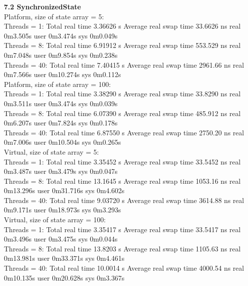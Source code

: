 \documentclass[letterpaper,twocolumn,10pt]{article}
\begin{document}
\textbf{7.2 SynchronizedState}\\

\noindent Platform, size of state array = 5:\\
Threads = 1: Total real time 3.36626 s
Average real swap time 33.6626 ns
real    0m3.505s
user    0m3.474s
sys     0m0.049s\\
Threads = 8: Total real time 6.91912 s
Average real swap time 553.529 ns
real    0m7.048s
user    0m9.854s
sys     0m0.238s\\
Threads = 40: Total real time 7.40415 s
Average real swap time 2961.66 ns
real    0m7.566s
user    0m10.274s
sys     0m0.112s\\

\noindent Platform, size of state array = 100:\\
Threads = 1: Total real time 3.38290 s
Average real swap time 33.8290 ns
real    0m3.511s
user    0m3.474s
sys     0m0.039s\\
Threads = 8: Total real time 6.07390 s
Average real swap time 485.912 ns
real    0m6.207s
user    0m7.824s
sys     0m0.178s\\
Threads = 40: Total real time 6.87550 s
Average real swap time 2750.20 ns
real    0m7.006s
user    0m10.504s
sys     0m0.265s\\

\noindent Virtual, size of state array = 5:\\
Threads = 1: Total real time 3.35452 s
Average real swap time 33.5452 ns
real    0m3.487s
user    0m3.479s
sys     0m0.047s\\
Threads = 8: Total real time 13.1645 s
Average real swap time 1053.16 ns
real    0m13.296s
user    0m31.716s
sys     0m4.602s\\
Threads = 40: Total real time 9.03720 s
Average real swap time 3614.88 ns
real    0m9.171s
user    0m18.973s
sys     0m3.293s\\

\noindent Virtual, size of state array = 100:\\
Threads = 1: Total real time 3.35417 s
Average real swap time 33.5417 ns
real    0m3.496s
user    0m3.475s
sys     0m0.044s\\
Threads = 8: Total real time 13.8203 s
Average real swap time 1105.63 ns
real    0m13.981s
user    0m33.371s
sys     0m4.461s\\
Threads = 40: Total real time 10.0014 s
Average real swap time 4000.54 ns
real    0m10.135s
user    0m20.628s
sys     0m3.367s\\
\end{document}
